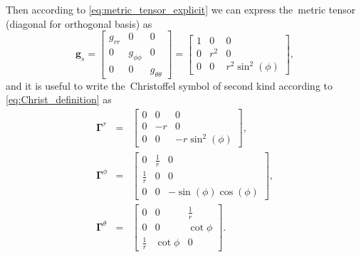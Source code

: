 \documentclass[preprint,12pt]{elsarticle}
\newcommand{\matr}[1]{\mathbf{#1}}
\begin{document}
Then according to \eqref{eq:metric_tensor_explicit} we can express the~metric
tensor (diagonal for orthogonal basis) as
\begin{equation}
  \matr{g}_s = \begin{bmatrix}
                 g_{rr} & 0 & 0 \\
			     0 & g_{\phi\phi} & 0 \\
			     0 & 0 & g_{\theta\theta}
			   \end{bmatrix}
             = \begin{bmatrix}
                 1 & 0 & 0 \\
			     0 & r^2 & 0 \\
			     0 & 0 & r^2\sin^2(\phi)
			   \end{bmatrix} ,
  \label{eq:spher_metric_tensor}		   
\end{equation}
and it is useful to write the~Christoffel symbol of second kind according to
\eqref{eq:Christ_definition} as
\begin{eqnarray}
  \matr{\Gamma}^r &=& 
    \begin{bmatrix}
	  0 & 0 & 0 \\
	  0 & -r & 0 \\
	  0 & 0 & -r \sin^2(\phi)
    \end{bmatrix} ,
  \nonumber \\
  \matr{\Gamma}^\phi &=& 
    \begin{bmatrix}
	  0 & \frac{1}{r} & 0 \\
	  \frac{1}{r} & 0 & 0 \\
	  0 & 0 & -\sin(\phi)\cos(\phi)
    \end{bmatrix} ,
  \label{eq:Christ_spherical}\\
  \matr{\Gamma}^\theta &=& 
    \begin{bmatrix}
	  0 & 0& \frac{1}{r} \\
	  0 & 0 & \cot{\phi} \\
	  \frac{1}{r} & \cot{\phi} & 0
    \end{bmatrix} .
  \nonumber
\end{eqnarray}
\end{document}

